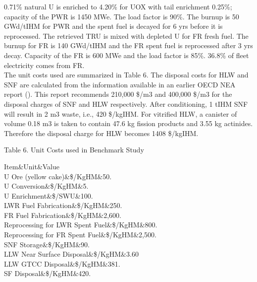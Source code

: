 0.71\% natural U is enriched to 4.20\% for UOX with tail enrichment
0.25\%; capacity of the PWR is 1450 MWe. The load factor is 90\%. The
burnup is 50 GWd/tIHM for PWR and the spent fuel is decayed for 6 yrs
before it is reprocessed. The retrieved TRU is mixed with depleted U for
FR fresh fuel. The burnup for FR is 140 GWd/tIHM and the FR spent fuel
is reprocessed after 3 yrs decay. Capacity of the FR is 600 MWe and the
load factor is 85\%. 36.8\% of fleet electricity comes from FR.\\



	The unit costs used are summarized in Table 6. The disposal costs for
HLW and SNF are calculated from the information available in an earlier
OECD NEA report ().  This report recommends 210,000 \$/m3 and 400,000
\$/m3 for the disposal charges of SNF and HLW respectively. After
conditioning, 1 tIHM SNF will result in 2 m3 waste, i.e., 420 \$/kgIHM.
For vitrified HLW, a canister of volume 0.18 m3 is taken to contain 47.6
kg fission products and 3.55 kg actinides.  Therefore the disposal
charge for HLW becomes 1408 \$/kgIHM.

Table 6.  Unit Costs used in Benchmark Study

Item&Unit&Value\\

U Ore (yellow cake)&\$/KgHM&50. \\

U Conversion&\$/KgHM&5. \\

U Enrichment&\$/SWU&100. \\

LWR Fuel Fabrication&\$/KgHM&250. \\

FR Fuel Fabrication&\$/KgHM&2,600. \\

Reprocessing for LWR Spent Fuel&\$/KgHM&800. \\

Reprocessing for FR Spent Fuel&\$/KgHM&2,500. \\

SNF Storage&\$/KgHM&90. \\

LLW Near Surface Disposal&\$/KgHM&3.60 \\

LLW GTCC Disposal&\$/KgHM&381. \\

SF Disposal&\$/KgHM&420. \\

